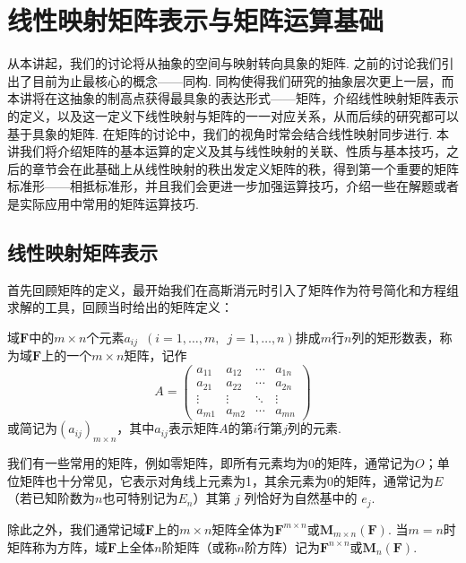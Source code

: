 \chapter{线性映射矩阵表示与矩阵运算基础} \label{chap:线性映射矩阵表示}

从本讲起，我们的讨论将从抽象的空间与映射转向具象的矩阵. 之前的讨论我们引出了目前为止最核心的概念——同构. 同构使得我们研究的抽象层次更上一层，而本讲将在这抽象的制高点获得最具象的表达形式——矩阵，介绍线性映射矩阵表示的定义，以及这一定义下线性映射与矩阵的一一对应关系，从而后续的研究都可以基于具象的矩阵. 在矩阵的讨论中，我们的视角时常会结合线性映射同步进行. 本讲我们将介绍矩阵的基本运算的定义及其与线性映射的关联、性质与基本技巧，之后的章节会在此基础上从线性映射的秩出发定义矩阵的秩，得到第一个重要的矩阵标准形——相抵标准形，并且我们会更进一步加强运算技巧，介绍一些在解题或者是实际应用中常用的矩阵运算技巧.

\section{线性映射矩阵表示}

首先回顾矩阵的定义，最开始我们在高斯消元时引入了矩阵作为符号简化和方程组求解的工具，回顾当时给出的矩阵定义：

\begin{definition}{}{}
    域$\mathbf{F}$中的$m\times n$个元素$a_{ij}\enspace(i=1,\ldots,m,\enspace j=1,\ldots,n)$排成$m$行$n$列的矩形数表，称为域$\mathbf{F}$上的一个$m\times n$矩阵，记作
    \[A=\begin{pmatrix}
            a_{11} & a_{12} & \cdots & a_{1n} \\
            a_{21} & a_{22} & \cdots & a_{2n} \\
            \vdots & \vdots & \ddots & \vdots \\
            a_{m1} & a_{m2} & \cdots & a_{mn}
        \end{pmatrix}\]
    或简记为$(a_{ij})_{m\times n}$，其中$a_{ij}$表示矩阵$A$的第$i$行第$j$列的元素.
\end{definition}

我们有一些常用的矩阵，例如零矩阵，即所有元素均为0的矩阵，通常记为$O$；单位矩阵也十分常见，它表示对角线上元素为1，其余元素为0的矩阵，通常记为$E$（若已知阶数为$n$也可特别记为$E_n$）其第 $j$ 列恰好为自然基中的 $e_j$.

除此之外，我们通常记域$\mathbf{F}$上的$m\times n$矩阵全体为$\mathbf{F}^{m\times n}$或$\mathbf{M}_{m\times n}(\mathbf{F})$. 当$m=n$时矩阵称为方阵，域$\mathbf{F}$上全体$n$阶矩阵（或称$n$阶方阵）记为$\mathbf{F}^{n\times n}$或$\mathbf{M}_n(\mathbf{F})$.

